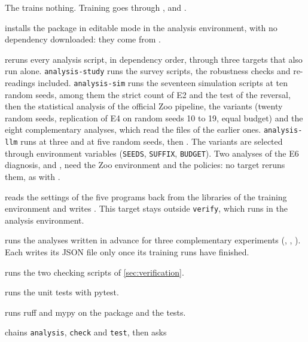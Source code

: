 The  trains nothing. Training goes through ,  and
.

\begin{description}[style=nextline,leftmargin=1.5em]
  \item[\texttt{make install}] installs the package in editable mode in the analysis environment,
        with no dependency downloaded: they come from .
  \item[\texttt{make analysis}] reruns every analysis script, in dependency order, through three
        targets that also run alone. \texttt{analysis-study} runs the survey scripts, the robustness
        checks and re-readings included. \texttt{analysis-sim} runs the seventeen simulation scripts at ten
        random seeds, among them the strict count of E2 and the test of the  reversal, then
        the statistical analysis of the official Zoo pipeline, the variants
        (twenty random seeds, replication of E4 on random seeds 10 to 19, equal budget) and the eight
        complementary analyses, which read the files of the earlier ones. \texttt{analysis-llm}
        runs  at three and at five random seeds, then .
        The variants are selected through environment variables (\texttt{SEEDS},
        \texttt{SUFFIX}, \texttt{BUDGET}). Two analyses of the E6 diagnosis,  and
        , need the Zoo environment and the policies: no target reruns them, as with
        .
  \item[\texttt{make hyperparams}] reads the settings of the five programs back from the libraries of the
        training environment and writes . This target stays
        outside \texttt{verify}, which runs in the analysis environment.
  \item[\texttt{make analysis-suite}] runs the analyses written in advance for three complementary experiments
        (, , ). Each writes its JSON file only once
        its training runs have finished.
  \item[\texttt{make check}] runs the two checking scripts of \cref{sec:verification}.
  \item[\texttt{make test}] runs the unit tests with pytest.
  \item[\texttt{make lint}] runs ruff and mypy on the package and the tests.
  \item[\texttt{make verify}] chains \texttt{analysis}, \texttt{check} and \texttt{test}, then asks

\end{description}
